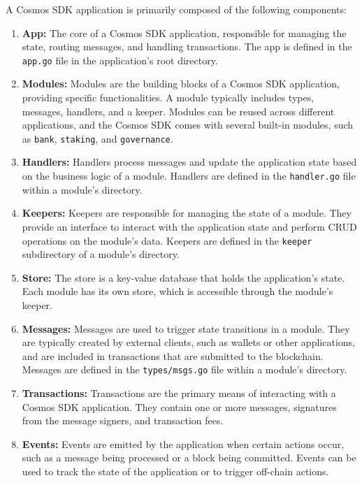 \documentclass{article}
\begin{document}
A Cosmos SDK application is primarily composed of the following components:

\begin{enumerate}
\item \textbf{App:} The core of a Cosmos SDK application, responsible for managing the state, routing messages, and handling transactions. The app is defined in the \texttt{app.go} file in the application's root directory.

\item \textbf{Modules:} Modules are the building blocks of a Cosmos SDK application, providing specific functionalities. A module typically includes types, messages, handlers, and a keeper. Modules can be reused across different applications, and the Cosmos SDK comes with several built-in modules, such as \texttt{bank}, \texttt{staking}, and \texttt{governance}.

\item \textbf{Handlers:} Handlers process messages and update the application state based on the business logic of a module. Handlers are defined in the \texttt{handler.go} file within a module's directory.

\item \textbf{Keepers:} Keepers are responsible for managing the state of a module. They provide an interface to interact with the application state and perform CRUD operations on the module's data. Keepers are defined in the \texttt{keeper} subdirectory of a module's directory.

\item \textbf{Store:} The store is a key-value database that holds the application's state. Each module has its own store, which is accessible through the module's keeper.

\item \textbf{Messages:} Messages are used to trigger state transitions in a module. They are typically created by external clients, such as wallets or other applications, and are included in transactions that are submitted to the blockchain. Messages are defined in the \texttt{types/msgs.go} file within a module's directory.

\item \textbf{Transactions:} Transactions are the primary means of interacting with a Cosmos SDK application. They contain one or more messages, signatures from the message signers, and transaction fees.

\item \textbf{Events:} Events are emitted by the application when certain actions occur, such as a message being processed or a block being committed. Events can be used to track the state of the application or to trigger off-chain actions.
\end{enumerate}
\end{document}
